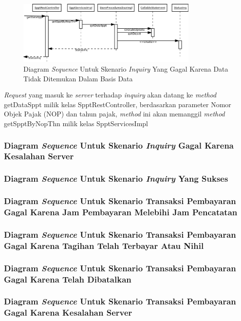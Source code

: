\documentclass[pdftex,12pt, oneside]{article}
\begin{document}
\begin{figure}[H]
  \centering
  \includegraphics[width=0.8\textwidth]{./resources/uml/uml-seq-inq-not-any}
  \caption{Diagram \textit{Sequence} Untuk Skenario \textit{Inquiry} Yang Gagal Karena Data Tidak Ditemukan Dalam Basis Data}
  \label{fig:uml-seq-inq-not-any}
\end{figure}

\textit{Request} yang masuk ke \textit{server} terhadap \textit{inquiry} akan datang ke \textit{method} getDataSppt milik kelas SpptRestController, berdasarkan parameter Nomor Objek Pajak (NOP) dan tahun pajak, \textit{method} ini akan memanggil \textit{method} getSpptByNopThn milik kelas SpptServicesImpl

\subsubsection{Diagram \textit{Sequence} Untuk Skenario \textit{Inquiry} Gagal Karena Kesalahan Server}
\subsubsection{Diagram \textit{Sequence} Untuk Skenario \textit{Inquiry} Yang Sukses}
\subsubsection{Diagram \textit{Sequence} Untuk Skenario Transaksi Pembayaran Gagal Karena Jam Pembayaran Melebihi Jam Pencatatan}
\subsubsection{Diagram \textit{Sequence} Untuk Skenario Transaksi Pembayaran Gagal Karena Tagihan Telah Terbayar Atau Nihil}
\subsubsection{Diagram \textit{Sequence} Untuk Skenario Transaksi Pembayaran Gagal Karena Telah Dibatalkan}
\subsubsection{Diagram \textit{Sequence} Untuk Skenario Transaksi Pembayaran Gagal Karena Kesalahan Server}
\end{document}
